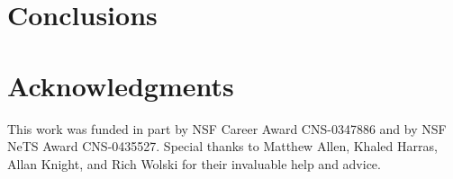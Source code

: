 \documentclass[conference]{IEEEtran}
\begin{document}
\section{Conclusions}\label{sec:conclusions}

\section{Acknowledgments}
This work was funded in part by NSF Career Award CNS-0347886 and by NSF NeTS Award CNS-0435527. Special thanks to Matthew Allen, Khaled Harras, Allan Knight, and Rich Wolski for their invaluable help and advice.


\end{document}
